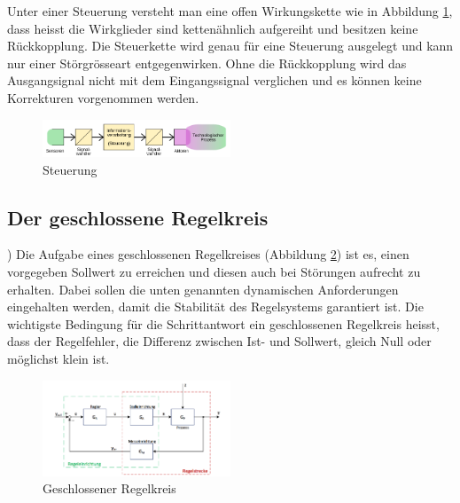 Unter einer Steuerung  versteht man eine offen Wirkungskette  wie in Abbildung
\ref{fig:Steuerung},   dass  heisst   die  Wirkglieder   sind  ketten\"ahnlich
aufgereiht  und  besitzen  keine R\"uckkopplung. Die  Steuerkette  wird  genau
f\"ur  eine   Steuerung  ausgelegt   und  kann  nur   einer  St\"orgr\"osseart
entgegenwirken. Ohne die  R\"uckkopplung wird das Ausgangsignal  nicht mit dem
Eingangssignal  verglichen  und  es  k\"onnen  keine  Korrekturen  vorgenommen
werden.

\begin{figure}[!h!, width=\pagewidth]
    \begin{center}
    \includegraphics[width=0.5\textwidth]{images/Steuerung}
    \caption{Steuerung}
    \label{fig:Steuerung}
    \end{center}
\end{figure}

\subsection{Der geschlossene Regelkreis} \label{subs:geschlossen})
Die      Aufgabe     eines      geschlossenen     Regelkreises      (Abbildung
\ref{fig:geschlossenerRegelkreis})  ist  es,   einen  vorgegeben  Sollwert  zu
erreichen und diesen  auch bei St\"orungen aufrecht  zu erhalten. Dabei sollen
die unten  genannten dynamischen  Anforderungen eingehalten werden,  damit die
Stabilit\"at des  Regelsystems garantiert ist. Die wichtigste  Bedingung f\"ur
die Schrittantwort ein geschlossenen  Regelkreis heisst, dass der Regelfehler,
die Differenz zwischen  Ist- und Sollwert, gleich Null  oder m\"oglichst klein
ist.


\begin{figure}[!h!, width=\pagewidth]
    \begin{center}
    \includegraphics[width=0.5\textwidth]{images/geschlRegelkreis}
    \caption{Geschlossener Regelkreis}
    \label{fig:geschlossenerRegelkreis}
    \end{center}
\end{figure}


